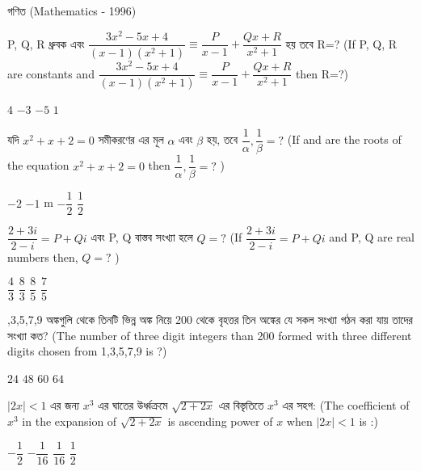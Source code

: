 \documentclass[addpoints]{exam}
\begin{document}
\begin{LARGE}
\begin{center}
গণিত (Mathematics - 1996)
\end{center}
\end{LARGE}
\begin{questions}

 \question  P, Q, R ধ্রুবক এবং $ \dfrac{3x^{2}-5x+4}{(x-1)(x^{2}+1)} \equiv \dfrac{P}{x-1} + \dfrac{Qx+R}{x^{2}+1} $ হয় তবে R=?  (If P, Q, R are constants and $ \dfrac{3x^{2}-5x+4}{(x-1)(x^{2}+1)} \equiv \dfrac{P}{x-1} + \dfrac{Qx+R}{x^{2}+1} $ then R=?)

\begin{oneparchoices}
\choice $ 4 $
\choice $ -3 $
\choice $ -5 $
\choice $ 1 $
\end{oneparchoices}

\question যদি $ x^{2}+x+2=0 $ সমীকরণের এর মূল $ \alpha $ এবং $ \beta  $ হয়, তবে $ \dfrac{1}{\alpha},\dfrac{1}{\beta} = ?$ (If  and are the roots of the equation $ x^{2}+x+2=0 $ then $ \dfrac{1}{\alpha},\dfrac{1}{\beta} = ?$ )

\begin{oneparchoices}
\choice $ -2 $
\choice $ -1 $ m
\choice $ -\dfrac{1}{2} $
\choice $ \dfrac{1}{2} $
\end{oneparchoices}

\question $ \dfrac{2+3i}{2-i} = P+Qi $ এবং P, Q বাস্তব সংখ্যা হলে $ Q=? $ (If $ \dfrac{2+3i}{2-i} = P+Qi $ and P, Q are real numbers then, $ Q=? $ )

\begin{oneparchoices}
\choice $ \dfrac{4}{3} $ 
\choice $ \dfrac{8}{3} $ 
\choice $ \dfrac{8}{5} $
\choice $ \dfrac{7}{5} $
\end{oneparchoices}

,3,5,7,9 অঙ্কগুলি থেকে তিনটি ভিন্ন অঙ্ক নিয়ে 200 থেকে বৃহত্তর তিন অঙ্কের যে সকল সংখ্যা গঠন করা যায় তাদের সংখ্যা কত? (The number of three digit integers than 200 formed with three different digits chosen from 1,3,5,7,9 is ?)
 

\begin{oneparchoices}
\choice $ 24 $ 
\choice $ 48 $ 
\choice $ 60 $
\choice $ 64 $
\end{oneparchoices}

\question  $ |2x|<1 $ এর জন্য $ x^{3} $ এর ঘাতের উর্ধ্বক্রমে $ \sqrt{2+2x} $ এর বিস্তৃতিতে $ x^{3} $ এর সহগ: (The coefficient of $ x^{3} $ in the expansion of $ \sqrt{2+2x} $ is ascending power of $ x $ when $ |2x|<1 $ is :)

\begin{oneparchoices}
\choice $ -\dfrac{1}{2} $
\choice $ -\dfrac{1}{16} $
\choice $ \dfrac{1}{16} $
\choice $ \dfrac{1}{2} $
\end{oneparchoices}



\end{questions}
\end{document}
